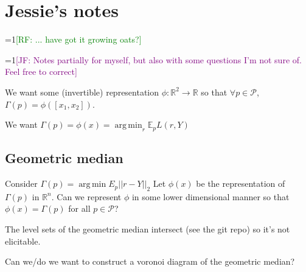 \documentclass[11pt]{article}
\newcommand{\Comments}{1}
\newcommand{\mynote}[2]{\ifnum\Comments=1\textcolor{#1}{#2}\fi}
\newcommand{\raf}[1]{\mynote{green}{[RF: #1]}}
\newcommand{\jessie}[1]{\mynote{purple}{[JF: #1]}}
\newcommand{\reals}{\mathbb{R}}
\newcommand{\E}{\mathbb{E}}
\renewcommand{\P}{\mathcal{P}}
\renewcommand{\P}{\mathcal{P}}
\DeclareMathOperator*{\argmin}{arg\,min}
\begin{document}
\section{Jessie's notes}
\raf{... have got it growing oats?}

\jessie{Notes partially for myself, but also with some questions I'm not sure of.  Feel free to correct}

We want some (invertible) representation $\phi: \reals^2 \to \reals$ so that $\forall p \in \P$, $\Gamma(p) = \phi([ x_1, x_2 ])$.

We want $\Gamma(p) = \phi(x) = \argmin_r \E_p L(r, Y)$

\subsection{Geometric median}
Consider $\Gamma(p) = \argmin E_p ||r - Y ||_2$
Let $\phi(x)$ be the representation of $\Gamma(p)$ in $\reals^n$.
Can we represent $\phi$ in some lower dimensional manner so that $\phi(x) = \Gamma(p)$ for all $p \in \P$?

The level sets of the geometric median intersect (see the git repo) so it's not elicitable.

Can we/do we want to construct a voronoi diagram of the geometric median?
\end{document}
